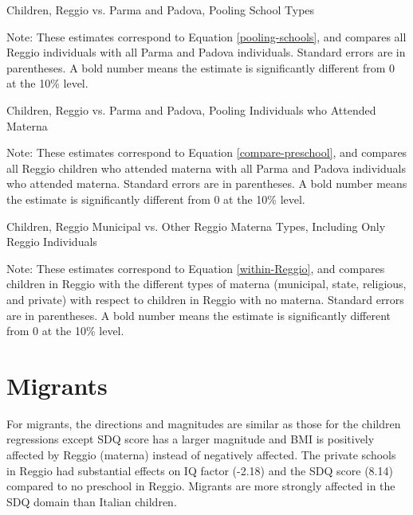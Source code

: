 \documentclass{article}
\begin{document}
\begin{table}[H]
\begin{center}
	\caption{Children, Reggio vs. Parma and Padova, Pooling School Types}
		
\end{center}
\raggedright
\footnotesize
Note: These estimates correspond to Equation \ref{pooling-schools}, and compares all Reggio individuals with all Parma and Padova individuals. Standard errors are in parentheses. A bold number means the estimate is significantly different from 0 at the 10\% level. 
\end{table}

\begin{table}[H]
\begin{center}
	\caption{Children, Reggio vs. Parma and Padova, Pooling Individuals who Attended Materna}
		
\end{center}
\raggedright
\footnotesize
Note: These estimates correspond to Equation \ref{compare-preschool}, and compares all Reggio children who attended materna with all Parma and Padova individuals who attended materna. Standard errors are in parentheses. A bold number means the estimate is significantly different from 0 at the 10\% level. 
\end{table}

\begin{table}[H]
\begin{center}
	\caption{Children, Reggio Municipal vs. Other Reggio Materna Types, Including Only Reggio Individuals}
		
\end{center}
\raggedright
\footnotesize
Note: These estimates correspond to Equation \ref{within-Reggio}, and compares children in Reggio with the different types of materna (municipal, state, religious, and private) with respect to children in Reggio with no materna. Standard errors are in parentheses. A bold number means the estimate is significantly different from 0 at the 10\% level. 
\end{table}


\section{Migrants}
For migrants, the directions and magnitudes are similar as those for the children regressions except SDQ score has a larger magnitude and BMI is positively affected by Reggio (materna) instead of negatively affected. The private schools in Reggio had substantial effects on IQ factor (-2.18) and the SDQ score (8.14) compared to no preschool in Reggio. Migrants are more strongly affected in the SDQ domain than Italian children.
\end{document}
